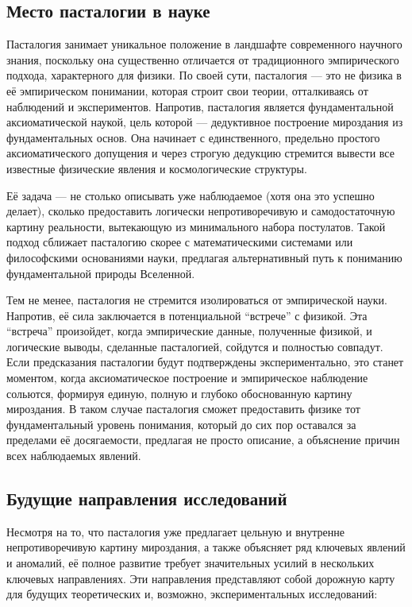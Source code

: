 \documentclass[pdflatex,sn-mathphys-num,referee]{sn-jnl}
\begin{document}
\subsection{Место пасталогии в науке}\label{subsec:place-in-science}

Пасталогия занимает уникальное положение в ландшафте современного научного знания, поскольку она существенно отличается от традиционного эмпирического подхода, характерного для физики. По своей сути, пасталогия --- это не физика в её эмпирическом понимании, которая строит свои теории, отталкиваясь от наблюдений и экспериментов. Напротив, пасталогия является фундаментальной аксиоматической наукой, цель которой --- дедуктивное построение мироздания из фундаментальных основ. Она начинает с единственного, предельно простого аксиоматического допущения и через строгую дедукцию стремится вывести все известные физические явления и космологические структуры.

Её задача --- не столько описывать уже наблюдаемое (хотя она это успешно делает), сколько предоставить логически непротиворечивую и самодостаточную картину реальности, вытекающую из минимального набора постулатов. Такой подход сближает пасталогию скорее с математическими системами или философскими основаниями науки, предлагая альтернативный путь к пониманию фундаментальной природы Вселенной.

Тем не менее, пасталогия не стремится изолироваться от эмпирической науки. Напротив, её сила заключается в потенциальной ``встрече'' с физикой. Эта ``встреча'' произойдет, когда эмпирические данные, полученные физикой, и логические выводы, сделанные пасталогией, сойдутся и полностью совпадут. Если предсказания пасталогии будут подтверждены экспериментально, это станет моментом, когда аксиоматическое построение и эмпирическое наблюдение сольются, формируя единую, полную и глубоко обоснованную картину мироздания. В таком случае пасталогия сможет предоставить физике тот фундаментальный уровень понимания, который до сих пор оставался за пределами её досягаемости, предлагая не просто описание, а объяснение причин всех наблюдаемых явлений.

\subsection{Будущие направления исследований}\label{subsec:future-directions}

Несмотря на то, что пасталогия уже предлагает цельную и внутренне непротиворечивую картину мироздания, а также объясняет ряд ключевых явлений и аномалий, её полное развитие требует значительных усилий в нескольких ключевых направлениях. Эти направления представляют собой дорожную карту для будущих теоретических и, возможно, экспериментальных исследований:
\end{document}
